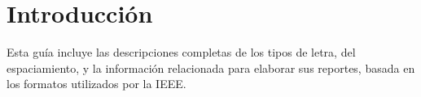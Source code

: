 \documentclass[journal,onecolumn]{IEEEtran}
\begin{document}



\maketitle


\IEEEdisplaynontitleabstractindextext







%
\IEEEpeerreviewmaketitle

\section{Introducción}
% 
% 
% 
% 
Esta guía incluye las descripciones completas de los tipos de letra, del espaciamiento, y la información relacionada para elaborar sus reportes, basada en los formatos utilizados por la IEEE.
\end{document}
